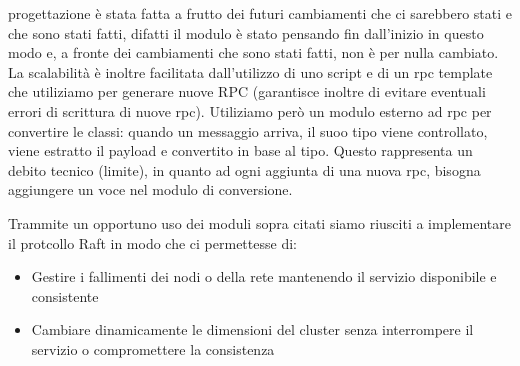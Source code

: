 \begin{itemize}
        progettazione è stata 
        fatta a frutto dei futuri cambiamenti che ci sarebbero stati e che sono stati fatti, 
        difatti il modulo è stato pensando fin dall'inizio in questo modo e, a fronte dei 
        cambiamenti che sono stati fatti, non è per nulla cambiato. 
        La scalabilità è inoltre facilitata dall'utilizzo di uno script e di un rpc template 
        che utiliziamo per generare nuove RPC (garantisce inoltre di evitare eventuali errori di 
        scrittura di nuove rpc). 
        Utiliziamo però un modulo esterno ad rpc per convertire le classi: quando un messaggio 
        arriva, il suoo tipo viene controllato, viene estratto il payload e convertito in base 
        al tipo. Questo rappresenta un debito tecnico (limite), in quanto ad ogni aggiunta di 
        una nuova rpc, bisogna aggiungere un voce nel modulo di conversione. 
\end{itemize}
Trammite un opportuno uso dei moduli sopra citati siamo riusciti a implementare il protcollo Raft
in modo che ci permettesse di:
\begin{itemize}
    \item Gestire i fallimenti dei nodi o della rete mantenendo il servizio disponibile e 
        consistente
    \item Cambiare dinamicamente le dimensioni del cluster senza interrompere il servizio 
        o compromettere la consistenza
\end{itemize}







